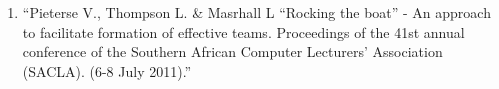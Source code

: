 \begin{enumerate}
\item ``Pieterse V., Thompson L. \& Masrhall L ``Rocking the boat'' - An approach to facilitate formation of effective teams. Proceedings of the 41st annual conference of the Southern African Computer Lecturers' Association (SACLA). (6-8 July 2011).''
\end{enumerate}